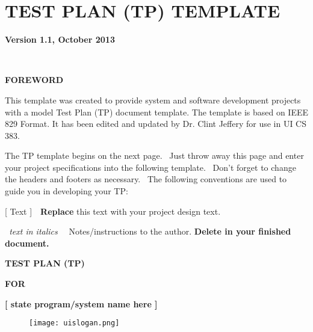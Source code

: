 \chapter{TEST PLAN (TP) TEMPLATE}

{\centering{}\bfseries\color{black}
Version 1.1, October 2013
\par}

\ 

{\centering{}\bfseries\color{black}
FOREWORD
\par}

{\color{black}
This template was created to provide system and software development
projects with a model Test Plan (TP) document template.
The template is based on IEEE 829 Format.
It has been edited and updated by
Dr. Clint Jeffery for use in UI CS 383.}

{\color{black}
The TP template begins on the next page. \ Just throw away this page
and enter your project specifications into the following template.
\ Don{\textquoteright}t forget to change the headers and footers as
necessary. \ The following conventions are used to guide you in
developing your TP:}

{\color{black}
\foreignlanguage{english}{[ Text
]\ \ }\foreignlanguage{english}{\textbf{Replace}}\foreignlanguage{english}{
this text with your project design text.}}

{\color{black}
\foreignlanguage{english}{\textit{\ }}\foreignlanguage{english}{\textit{text
in italics }}\foreignlanguage{english}{\ \ Notes/instructions to the
author. }\foreignlanguage{english}{\textbf{Delete in your finished
document.}}}


\bigskip

{\centering\bfseries\color{black}
TEST PLAN (TP)}

{\centering{}\bfseries\color{black}
FOR
\par}


\bigskip

{\centering{}\bfseries\color{black}
[ state program/system name here ]
\par}


\bigskip


\bigskip


\bigskip

\begin{figure}
\centering
\texttt{[image: uislogan.png]}
\end{figure}


